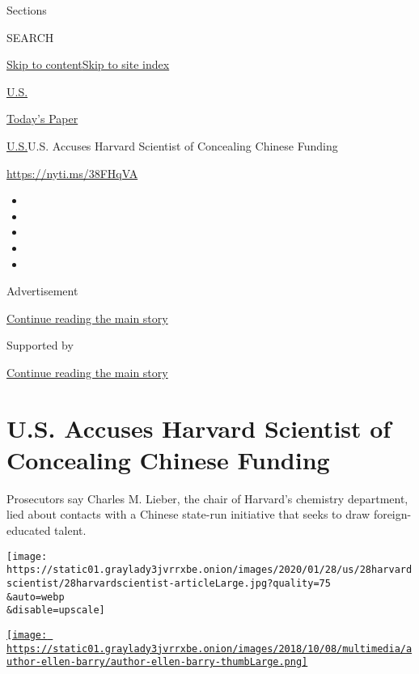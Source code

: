 Sections

SEARCH

\protect\hyperlink{site-content}{Skip to
content}\protect\hyperlink{site-index}{Skip to site index}

\href{https://www.nytimes3xbfgragh.onion/section/us}{U.S.}

\href{https://myaccount.nytimes3xbfgragh.onion/auth/login?response_type=cookie\&client_id=vi}{}

\href{https://www.nytimes3xbfgragh.onion/section/todayspaper}{Today's
Paper}

\href{/section/us}{U.S.}\textbar{}U.S. Accuses Harvard Scientist of
Concealing Chinese Funding

\href{https://nyti.ms/38FHqVA}{https://nyti.ms/38FHqVA}

\begin{itemize}
\item
\item
\item
\item
\item
\end{itemize}

Advertisement

\protect\hyperlink{after-top}{Continue reading the main story}

Supported by

\protect\hyperlink{after-sponsor}{Continue reading the main story}

\hypertarget{us-accuses-harvard-scientist-of-concealing-chinese-funding}{%
\section{U.S. Accuses Harvard Scientist of Concealing Chinese
Funding}\label{us-accuses-harvard-scientist-of-concealing-chinese-funding}}

Prosecutors say Charles M. Lieber, the chair of Harvard's chemistry
department, lied about contacts with a Chinese state-run initiative that
seeks to draw foreign-educated talent.

\texttt{[image: https://static01.graylady3jvrrxbe.onion/images/2020/01/28/us/28harvardscientist/28harvardscientist-articleLarge.jpg?quality=75\\\&auto=webp\\\&disable=upscale]}

\href{https://www.nytimes3xbfgragh.onion/by/ellen-barry}{\texttt{[image: https://static01.graylady3jvrrxbe.onion/images/2018/10/08/multimedia/author-ellen-barry/author-ellen-barry-thumbLarge.png]}}

